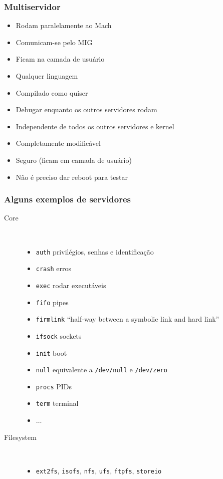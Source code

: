 \documentclass[10pt]{beamer}
\theoremstyle{plain}
\newcommand{\code}[1]{\lstinline[mathescape=true]{#1}}
\begin{document}
\begin{frame}
  \frametitle{Multiservidor}
  \begin{itemize}
    \item Rodam paralelamente ao Mach
    \item Comunicam-se pelo MIG
    \item Ficam na camada de usuário
    \item Qualquer linguagem
    \item Compilado como quiser
    \item Debugar enquanto os outros servidores rodam
    \item Independente de todos os outros servidores e kernel
    \item Completamente modificável
    \item Seguro (ficam em camada de usuário)
    \item Não é preciso dar reboot para testar
  \end{itemize}
\end{frame}

\begin{frame}
  \frametitle{Alguns exemplos de servidores}
  \begin{description}
    \item[Core]~\\
      \begin{itemize}
        \item \code{auth} privilégios, senhas e identificação
        \item \code{crash} erros
        \item \code{exec} rodar executáveis
        \item \code{fifo} pipes
        \item \code{firmlink} ``half-way between a symbolic link and hard link''
        \item \code{ifsock} sockets
        \item \code{init} boot
        \item \code{null} equivalente a \code{/dev/null} e \code{/dev/zero}
        \item \code{procs} PIDs
        \item \code{term} terminal
        \item $\ldots$
      \end{itemize}
    \item[Filesystem]~\\
      \begin{itemize}
        \item \code{ext2fs}, \code{isofs}, \code{nfs}, \code{ufs}, \code{ftpfs}, \code{storeio}
      \end{itemize}
  \end{description}
\end{frame}
\end{document}

